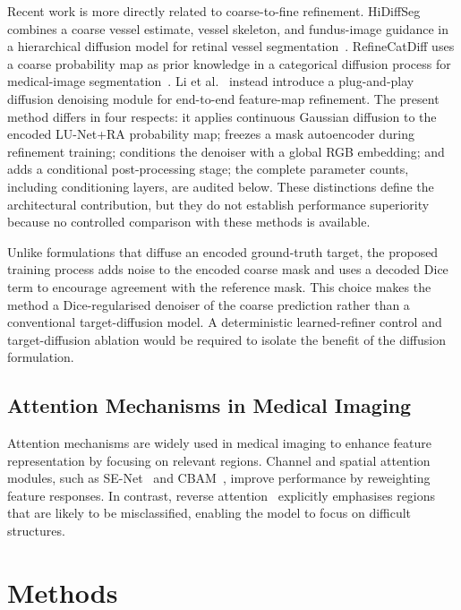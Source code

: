 \documentclass[jimaging,article,submit,pdftex,moreauthors]
  {Definitions/mdpi}
\begin{document}
Recent work is more directly related to coarse-to-fine refinement. HiDiffSeg combines a coarse vessel estimate, vessel skeleton, and fundus-image guidance in a hierarchical diffusion model for retinal vessel segmentation~\cite{HiDiffSeg}. RefineCatDiff uses a coarse probability map as prior knowledge in a categorical diffusion process for medical-image segmentation~\cite{RefineCatDiff}. Li et al.~\cite{DiffusionFMD} instead introduce a plug-and-play diffusion denoising module for end-to-end feature-map refinement. The present method differs in four respects: it applies continuous Gaussian diffusion to the encoded LU-Net+RA probability map; freezes a mask autoencoder during refinement training; conditions the denoiser with a global RGB embedding; and adds a conditional post-processing stage; the complete parameter counts, including conditioning layers, are audited below. These distinctions define the architectural contribution, but they do not establish performance superiority because no controlled comparison with these methods is available.

Unlike formulations that diffuse an encoded ground-truth target, the proposed training process adds noise to the encoded coarse mask and uses a decoded Dice term to encourage agreement with the reference mask. This choice makes the method a Dice-regularised denoiser of the coarse prediction rather than a conventional target-diffusion model. A deterministic learned-refiner control and target-diffusion ablation would be required to isolate the benefit of the diffusion formulation.

\subsection{Attention Mechanisms in Medical Imaging}

Attention mechanisms are widely used in medical imaging to enhance feature representation by focusing on relevant regions. Channel and spatial attention modules, such as SE-Net~\cite{Hu2018} and CBAM~\cite{Woo2018}, improve performance by reweighting feature responses. In contrast, reverse attention~\cite{Hernandez2025} explicitly emphasises regions that are likely to be misclassified, enabling the model to focus on difficult structures.


\section{Methods}
\label{sec:methods}
\end{document}
